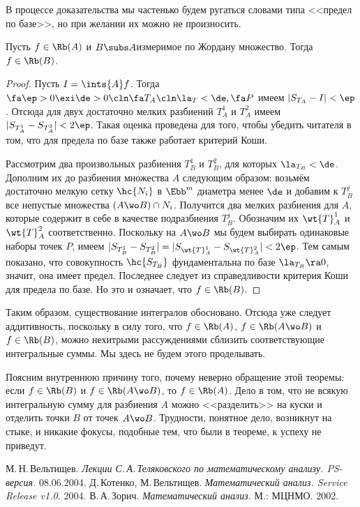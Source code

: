 \documentclass[a4paper]{article}
\begin{document}
В процессе доказательства мы частенько будем ругаться словами типа <<предел по базе>>, но при
желании их можно не произносить.

\begin{theorem}
Пусть $f \in \Rb(A)$ и $B \subs A$\т измеримое по Жордану множество.
Тогда $f \in \Rb(B)$.
\end{theorem}
\begin{proof}
Пусть $I = \ints{A} f$. Тогда $\fa \ep > 0 \exi \de > 0\cln \fa T_A\cln \la_T < \de, \fa P$
имеем $|S_{T_A} - I| < \ep$. Отсюда для двух достаточно мелких разбиений $T_A^1$ и $T_A^2$
имеем $|S_{T_A^1} - S_{T_A^2}| < 2\ep$. Такая оценка проведена для того, чтобы убедить читателя
в том, что для предела по базе также работает критерий Коши.

Рассмотрим два произвольных разбиения $T_B^1$ и $T_B^2$, для которых $\la_{T_B} <\de$. Дополним их
до разбиения множества $A$ следующим образом: возьмём достаточно мелкую сетку $\hc{N_i}$ в $\Ebb^m$
диаметра менее $\de$ и добавим к $T_B^j$ все непустые множества $(A \wo B) \cap N_i$. Получится два
мелких разбиения для $A$, которые содержит в себе в качестве подразбиения $T_B^j$. Обозначим их $\wt{T}^1_A$
и $\wt{T}_A^2$ соответственно. Поскольку на $A \wo B$ мы будем выбирать одинаковые наборы точек $P$,
имеем $|S_{T_B^1} - S_{T_B^2}| = |S_{\wt{T}_A^1} - S_{\wt{T}_A^2}| < 2\ep$. Тем самым показано,
что совокупность $\hc{S_{T_B}}$ фундаментальна по базе $\la_{T_B} \ra 0$, значит, она имеет предел.
Последнее следует из справедливости критерия Коши для предела по базе.
Но это и означает, что $f \in \Rb(B)$.
\end{proof}

Таким образом, существование интегралов обосновано. Отсюда уже следует аддитивность,
поскольку в силу того, что $f \in \Rb(A)$, $f \in \Rb(A \wo B)$ и $f \in \Rb(B)$, можно
нехитрыми рассуждениями сблизить соответствующие интегральные суммы. Мы здесь не будем
этого проделывать.

Поясним внутреннюю причину того, почему неверно обращение этой теоремы: если $f \in \Rb(B)$ и $f \in \Rb(A \wo B)$,
то $f \in \Rb(A)$. Дело в том, что не всякую интегральную сумму для разбиения $A$ можно <<разделить>>
на куски и отделить точки $B$ от точек $A \wo B$. Трудности, понятное дело,
возникнут на стыке, и никакие фокусы, подобные тем, что были в теореме, к успеху не приведут.


\begin{thebibliography}{[1]}
 М.\,Н.\,Вельтищев. \emph{Лекции С.\,А.\,Теляковского по математическому
анализу. PS-версия.} 08.06.2004.
 Д.\,Котенко, М.\,Вельтищев. \emph{Математический анализ. Service Release v1.0.} 2004.
 В.\,А.\,Зорич. \emph{Математический анализ.} М.: МЦНМО. 2002.
\end{thebibliography}
\end{document}
